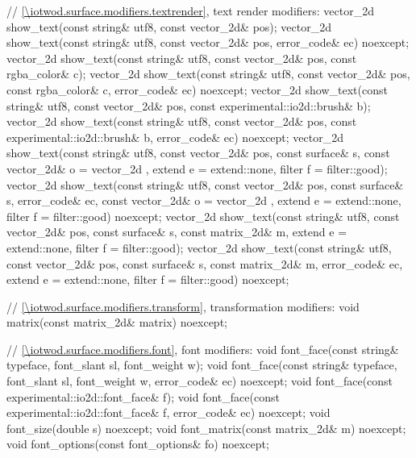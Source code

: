 \begin{codeblock}
{{{{{    // \ref{\iotwod.surface.modifiers.textrender}, text render modifiers:
    vector_2d show_text(const string& utf8, const vector_2d& pos);
    vector_2d show_text(const string& utf8, const vector_2d& pos,
      error_code& ec) noexcept;
    vector_2d show_text(const string& utf8, const vector_2d& pos,
      const rgba_color& c);
    vector_2d show_text(const string& utf8, const vector_2d& pos,
      const rgba_color& c, error_code& ec) noexcept;
    vector_2d show_text(const string& utf8, const vector_2d& pos,
      const experimental::io2d::brush& b);
    vector_2d show_text(const string& utf8, const vector_2d& pos,
      const experimental::io2d::brush& b, error_code& ec) noexcept;
    vector_2d show_text(const string& utf8, const vector_2d& pos,
      const surface& s, const vector_2d& o = vector_2d{ },
      extend e = extend::none, filter f = filter::good);
    vector_2d show_text(const string& utf8, const vector_2d& pos,
      const surface& s, error_code& ec, const vector_2d& o = vector_2d{ },
      extend e = extend::none, filter f = filter::good) noexcept;
    vector_2d show_text(const string& utf8, const vector_2d& pos,
      const surface& s, const matrix_2d& m, extend e = extend::none,
      filter f = filter::good);
    vector_2d show_text(const string& utf8, const vector_2d& pos,
      const surface& s, const matrix_2d& m, error_code& ec,
      extend e = extend::none, filter f = filter::good) noexcept;
    
    // \ref{\iotwod.surface.modifiers.transform}, transformation modifiers:
    void matrix(const matrix_2d& matrix) noexcept;
    
    // \ref{\iotwod.surface.modifiers.font}, font modifiers:
    void font_face(const string& typeface, font_slant sl, font_weight w);
    void font_face(const string& typeface, font_slant sl, font_weight w,
      error_code& ec) noexcept;
    void font_face(const experimental::io2d::font_face& f);
    void font_face(const experimental::io2d::font_face& f, error_code& ec)
      noexcept;
    void font_size(double s) noexcept;
    void font_matrix(const matrix_2d& m) noexcept;
    void font_options(const font_options& fo) noexcept;
    
}}}}}
\end{codeblock}
